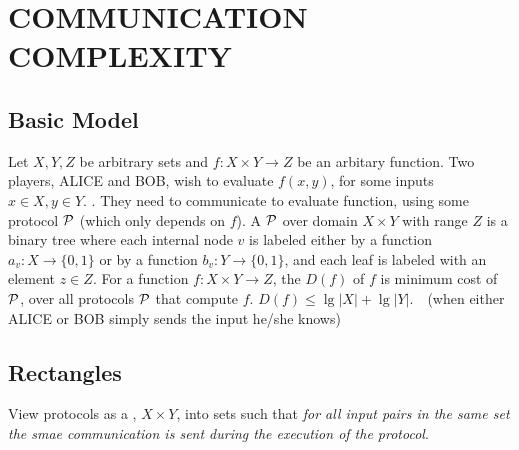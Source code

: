 \section{COMMUNICATION COMPLEXITY}
\subsection{Basic Model}
\bit
\w Let $X, Y, Z$ be arbitrary sets and $f: X \times Y \rightarrow Z$ be an
arbitary function. Two players, ALICE and BOB, wish to evaluate $f(x, y)$,
for some inputs $x \in X, y \in Y$.  . They need to communicate to evaluate function,  using some
protocol $\cal P$ (which only depends on $f$). 
\w A  $\cal P$ over domain $X \times Y$ with range $Z$ is a
binary tree where each internal node $v$ is labeled either by a function $a_v:
X \rightarrow \{0, 1\}$ or by a function $b_v: Y \rightarrow \{0, 1\}$, and
each leaf is labeled with an element $z \in Z$.
\w For a function $f: X \times Y \rightarrow Z$, the  $D(f)$ of $f$ is minimum cost of $\cal P$, over
all protocols $\cal P$ that compute $f$. 
\w $D(f) \le \lg |X| + \lg |Y|$.\ \  (when either ALICE or BOB simply sends the input
he/she knows) 
\eit
\subsection{Rectangles}
\bit
\w View protocols as a , $X \times Y$, into sets such that {\em for all input pairs in the
  same set the smae communication is sent during the execution of the
  protocol\/}.  
\eit

